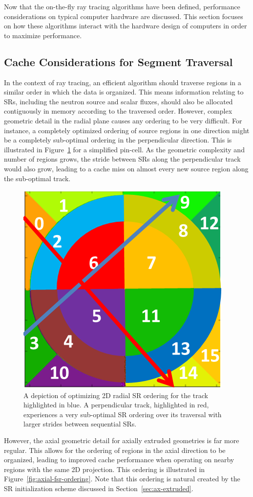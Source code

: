 Now that the on-the-fly ray tracing algorithms have been defined, performance considerations on typical computer hardware are discussed. This section focuses on how these algorithms interact with the hardware design of computers in order to maximize performance.

\subsection{Cache Considerations for Segment Traversal}

In the context of ray tracing, an efficient algorithm should traverse regions in a similar order in which the data is organized. This means information relating to \ac{SR}s, including the neutron source and scalar fluxes, should also be allocated contiguously in memory according to the traversed order. However, complex geometric detail in the radial plane causes any ordering to be very difficult. For instance, a completely optimized ordering of source regions in one direction might be a completely sub-optimal ordering in the perpendicular direction. This is illustrated in Figure~\ref{fig:radial-fsr-ordering} for a simplified pin-cell. As the geometric complexity and number of regions grows, the stride between \ac{SR}s along the perpendicular track would also grow, leading to a cache miss on almost every new source region along the sub-optimal track. 

\begin{figure}[ht!]
	\centering
	\includegraphics[width=0.4\linewidth]{figures/FSR_ordering_radial.PNG}
	\caption{A depiction of optimizing 2D radial \ac{SR} ordering for the track highlighted in blue. A perpendicular track, highlighted in red, experiences a very sub-optimal \ac{SR} ordering over its traversal with larger strides between sequential \ac{SR}s.}
	\label{fig:radial-fsr-ordering}
\end{figure}

However, the axial geometric detail for axially extruded geometries is far more regular. This allows for the ordering of regions in the axial direction to be organized, leading to improved cache performance when operating on nearby regions with the same 2D projection. This ordering is illustrated in Figure~\ref{fig:axial-fsr-ordering}. Note that this ordering is natural created by the \ac{SR} initialization scheme discussed in Section~\ref{sec:ax-extruded}.

